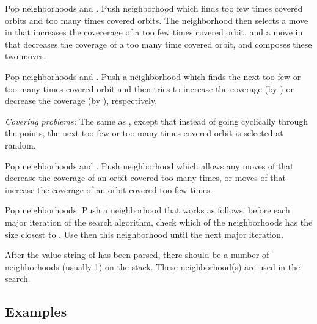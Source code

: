 \documentclass[12pt,a4paper]{article}
\begin{document}
\begin{owndescription}
\item[\Var{largebalance}] Pop neighborhoods  and .
  Push neighborhood which finds too few times covered orbits and too
  many times covered orbits. The neighborhood then selects a move in
   that increases the covererage of a too few times covered
  orbit, and a move in  that decreases the coverage of a too
  many time covered orbit, and composes these two moves.
\item[\Var{correct}] Pop neighborhoods
   and . Push a neighborhood which finds the next
  too few or too many times covered orbit and then tries to increase
  the coverage (by ) or decrease the coverage (by
  ), respectively.
\item[\Var{correctrandom}] \emph{Covering problems:} The same as
  , except that instead of going cyclically through the
  points, the next too few or too many times covered orbit is selected
  at random.
\item[\Var{largecorrect}] Pop neighborhoods  and . Push
  neighborhood which allows any moves of  that decrease the
  coverage of an orbit covered too many times, or moves of 
  that increase the coverage of an orbit covered too few times.
\item[\Val{n} \Val{goal} \Var{select}] Pop 
  neighborhoods. Push a neighborhood that works as follows: before
  each major iteration of the search algorithm, check which of the
   neighborhoods has the size closest to . Use then
  this neighborhood until the next major iteration.
\end{owndescription}

After the value string of  has been parsed, there should be
a number of neighborhoods (usually 1) on the stack. These
neighborhood(s) are used in the search.

\subsection{Examples}
\label{sec:examples}
\end{document}
